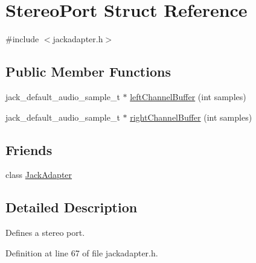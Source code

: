 \hypertarget{structStereoPort}{\section{\-Stereo\-Port \-Struct \-Reference}
\label{d9/d6d/structStereoPort}
}


{\ttfamily \#include $<$jackadapter.\-h$>$}

\subsection*{\-Public \-Member \-Functions}
\begin{DoxyCompactItemize}
\item 
jack\-\_\-default\-\_\-audio\-\_\-sample\-\_\-t $\ast$ \hyperlink{structStereoPort_a9d1db263dea1aad7e25f91b765ec77ae}{left\-Channel\-Buffer} (int samples)
\item 
jack\-\_\-default\-\_\-audio\-\_\-sample\-\_\-t $\ast$ \hyperlink{structStereoPort_afcb1e6bdca2644357aa9a5c976fb0f79}{right\-Channel\-Buffer} (int samples)
\end{DoxyCompactItemize}
\subsection*{\-Friends}
\begin{DoxyCompactItemize}
\item 
class \hyperlink{structStereoPort_ad8cc007d4c961816b3ea53a853b8ca16}{\-Jack\-Adapter}
\end{DoxyCompactItemize}


\subsection{\-Detailed \-Description}
\-Defines a stereo port. 

\-Definition at line 67 of file jackadapter.\-h.



